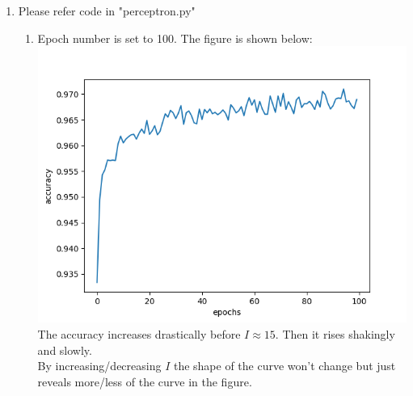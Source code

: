 \documentclass[11pt, oneside]{article}   	%
\begin{document}
\begin{enumerate}
\item	%
  Please refer code in "perceptron.py"
  \begin{enumerate}
  \item	%
    Epoch number is set to 100. The figure is shown below:\\
    \includegraphics[width=15cm]{2.1a.png}\\
    The accuracy increases drastically before $ I \approx 15 $. Then it rises shakingly and slowly.\\
    By increasing/decreasing $ I $ the shape of the curve won't change but just reveals more/less of the curve in the figure.
    

\end{enumerate}
\end{enumerate}
\end{document}
